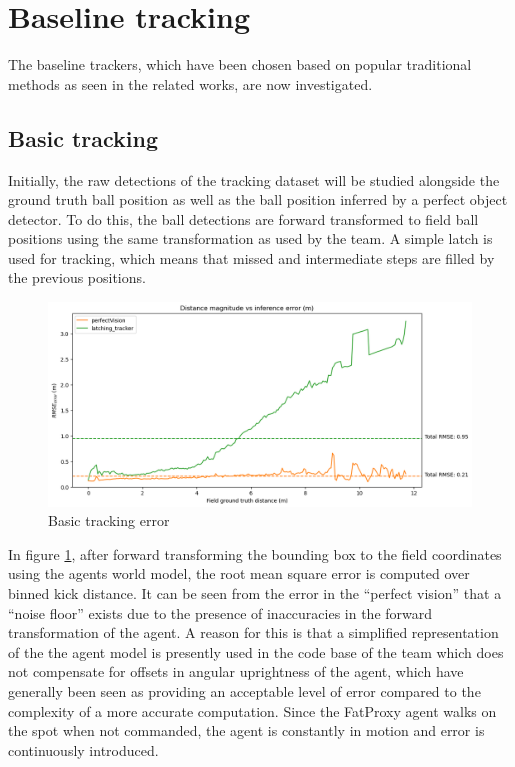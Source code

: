 \documentclass[a4paper,twoside,12pt]{report}
\begin{document}
\section{Baseline tracking}

The baseline trackers, which have been chosen based on popular traditional methods as seen in the related works, are now investigated.

\subsection{Basic tracking}

Initially, the raw detections of the tracking dataset will be studied alongside the ground truth ball position as well as the ball position inferred by a perfect object detector. To do this, the ball detections are forward transformed to field ball positions using the same transformation as used by the team. A simple latch is used for tracking, which means that missed and intermediate steps are filled by the previous positions.

\begin{figure}[h!]
\begin{center}
\includegraphics[width=13cm]{images/raw_error.png}
\caption{Basic tracking error}
\label{fig:rawerror}
\end{center}
\end{figure}

In figure \ref{fig:rawerror}, after forward transforming the bounding box to the field coordinates using the agents world model, the root mean square error is computed over binned kick distance. It can be seen from the error in the ``perfect vision'' that a ``noise floor'' exists due to the presence of inaccuracies in the forward transformation of the agent. A reason for this is that a simplified representation of the the agent model is presently used in the code base of the team which does not compensate for offsets in angular uprightness of the agent, which have generally been seen as providing an acceptable level of error compared to the complexity of a more accurate computation. Since the FatProxy agent walks on the spot when not commanded, the agent is constantly in motion and error is continuously introduced.
\end{document}
